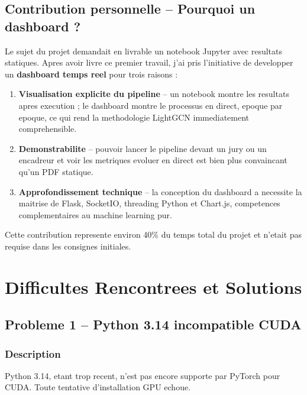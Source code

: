 \documentclass[12pt,a4paper]{report}
\begin{document}
\section{Contribution personnelle -- Pourquoi un dashboard ?}

Le sujet du projet demandait en livrable un notebook Jupyter
avec resultats statiques. Apres avoir livre ce premier travail,
j'ai pris l'initiative de developper un \textbf{dashboard
temps reel} pour trois raisons :

\begin{enumerate}[label=\textbf{\arabic*.}]
  \item \textbf{Visualisation explicite du pipeline} -- un
    notebook montre les resultats apres execution ; le dashboard
    montre le processus en direct, epoque par epoque, ce qui
    rend la methodologie LightGCN immediatement comprehensible.

  \item \textbf{Demonstrabilite} -- pouvoir lancer le pipeline
    devant un jury ou un encadreur et voir les metriques evoluer
    en direct est bien plus convaincant qu'un PDF statique.

  \item \textbf{Approfondissement technique} -- la conception
    du dashboard a necessite la maitrise de Flask, SocketIO,
    threading Python et Chart.js, competences complementaires
    au machine learning pur.
\end{enumerate}

Cette contribution represente environ 40\% du temps total
du projet et n'etait pas requise dans les consignes initiales.

\chapter{Difficultes Rencontrees et Solutions}

\section{Probleme 1 -- Python 3.14 incompatible CUDA}

\subsection{Description}
Python 3.14, etant trop recent, n'est pas encore supporte par PyTorch
pour CUDA. Toute tentative d'installation GPU echoue.
\end{document}
